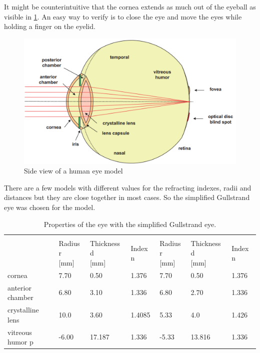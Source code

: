 It might be counterintuitive that the cornea extends as much out of the eyeball as visible in \ref{fig:humanEyeModel}. An easy way to verify is to close the eye and move the eyes while holding a finger on the eyelid.
\label{sec:theHumanEye}
\begin{figure}[H]
	\centering
	\includegraphics[scale=0.3]{images/human_eye_model.png}
	\caption{Side view of a human eye model \cite{gross:opticalSystems}}
	\label{fig:humanEyeModel}
\end{figure}

There are a few models with different values for the refracting indexes, radii and distances but they are close together in most cases. So the simplified Gullstrand eye was chosen for the model.

\begin{table}[!htb]
\centering
\begin{tabular}{@{}|l|l|l|l|l|l|l|@{}}
	\hline
	\multirow{2}{*}{} & \multicolumn{3}{l|}{\thead{Relaxed}} & \multicolumn{3}{l|}{\thead{Accomodated}} \\ \hhline{~------}
	\thead{ Notaton\\{}} &  \thead{Radius r \\ {}[mm] }        & \thead{Thickness d\\ {}[mm]}    & \thead{Index n\\ {}}        & \thead{Radius r \\ {}[mm] }& \thead{Thickness d \\ {}[mm] }& \thead{Index n\\{} }    \\ \hline
	cornea     &  7.70        & 0.50      & 1.376       &  7.70   &0.50  & 1.376\\ \hline
	anterior chamber & 6.80        & 3.10     & 1.336       & 6.80    & 2.70&1.336 \\ \hline
	crystalline lens     &  10.0    & 3.60          & 1.4085    & 5.33   &   4.0  &  1.426 \\ \hline
	vitreous humor    p  & -6.00      & 17.187         & 1.336    & -5.33  & 13.816  &  1.336  \\ \hline
\end{tabular}
\caption{Properties of the eye with the simplified Gullstrand eye. \cite{gross:opticalSystems}}
\label{tab:gullstrandEye}
\end{table}

